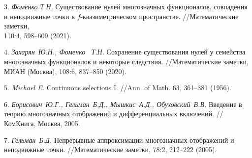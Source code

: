 3.
{\it Фоменко Т.Н.} Существование нулей многозначных фу\-нкционалов, совпадения и неподвижные точки в $f$-ква\-зи\-мет\-ри\-чес\-ком пространстве. //Математические заметки, \\110:4, 598--609 (2021).

4.
{\it Захарян~Ю.Н., Фоменко ~Т.Н.}  Сохранение существования нулей у семейства многозначных функционалов и некоторые следствия. //Математические заметки, МИАН (Мос\-ква), 108:6, 837--850 (2020).

5.
{\it Michael E. } Continuous selections I. //Ann. of Math. 63, 361--381 (1956).

6.
{\it Борисович~Ю.Г., Гельман~Б.Д., Мышкис~А.Д., Обухов\-ский~В.В.}
Введение в теорию многозначных отображений и дифференциальных включений. //КомКнига, Москва, 2005.

7.
{\it Гельман~Б.Д.} Непрерывные аппроксимации многозначных отображений и неподвижные точки. //Математические заметки,  78:2, 212--222 (2005).
